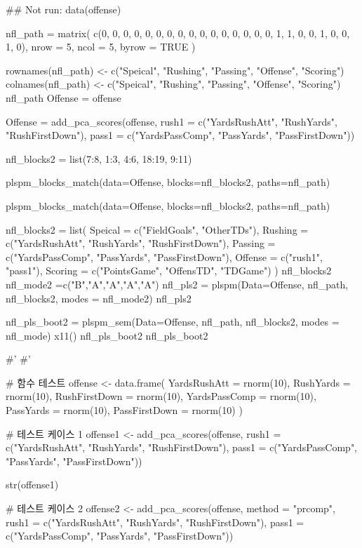 \documentclass[a4paper]{book}
\begin{document}
\begin{Examples}
\begin{ExampleCode}

\#\# Not run: 
data(offense)

nfl_path = matrix(
  c(0, 0, 0, 0, 0,
    0, 0, 0, 0, 0,
    0, 0, 0, 0, 0,
    0, 1, 1, 0, 0,
    1, 0, 0, 1, 0),
  nrow = 5, ncol = 5, byrow = TRUE )

rownames(nfl_path) <- c("Speical", "Rushing", "Passing", "Offense", "Scoring")
colnames(nfl_path) <- c("Speical", "Rushing", "Passing", "Offense", "Scoring")
nfl_path
Offense = offense %

Offense =  add_pca_scores(offense,
               rush1 = c("YardsRushAtt", "RushYards", "RushFirstDown"),
               pass1 = c("YardsPassComp", "PassYards", "PassFirstDown"))


nfl_blocks2 = list(7:8, 1:3, 4:6,  18:19, 9:11)

plspm_blocks_match(data=Offense, blocks=nfl_blocks2,
                   paths=nfl_path)

plspm_blocks_match(data=Offense, blocks=nfl_blocks2,
                   paths=nfl_path)%

nfl_blocks2 = list(
  Speical = c("FieldGoals", "OtherTDs"),
  Rushing = c("YardsRushAtt", "RushYards", "RushFirstDown"),
  Passing = c("YardsPassComp", "PassYards", "PassFirstDown"),
  Offense = c("rush1", "pass1"),
  Scoring = c("PointsGame", "OffensTD", "TDGame")
)
nfl_blocks2
nfl_mode2 =c("B","A","A","A","A")
nfl_pls2 = plspm(Data=Offense, nfl_path, nfl_blocks2, modes = nfl_mode2)
nfl_pls2%

nfl_pls_boot2 = plspm_sem(Data=Offense, nfl_path, nfl_blocks2, modes = nfl_mode)
x11()
nfl_pls_boot2 %
nfl_pls_boot2 %

#'
#'

# 함수 테스트
offense <- data.frame(
  YardsRushAtt = rnorm(10),
  RushYards = rnorm(10),
  RushFirstDown = rnorm(10),
  YardsPassComp = rnorm(10),
  PassYards = rnorm(10),
  PassFirstDown = rnorm(10)
)

# 테스트 케이스 1
offense1 <- add_pca_scores(offense,
                           rush1 = c("YardsRushAtt", "RushYards", "RushFirstDown"),
                           pass1 = c("YardsPassComp", "PassYards", "PassFirstDown"))

str(offense1)

# 테스트 케이스 2
offense2 <- add_pca_scores(offense, method = "prcomp",
                           rush1 = c("YardsRushAtt", "RushYards", "RushFirstDown"),
                           pass1 = c("YardsPassComp", "PassYards", "PassFirstDown"))


\end{ExampleCode}
\end{Examples}
\end{document}
